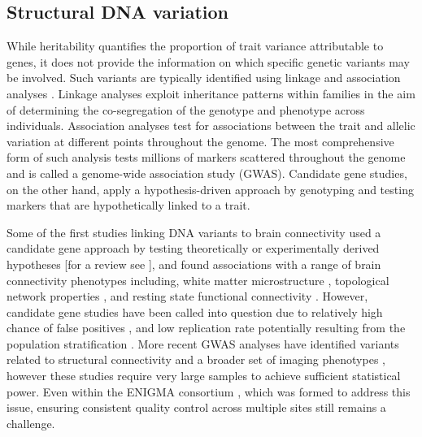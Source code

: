\subsection{Structural DNA variation}

While heritability quantifies the proportion of trait variance attributable to genes, it does not provide the information on which specific genetic variants may be involved. Such variants are typically identified using linkage and association analyses \citep{Thompson2013}. Linkage analyses exploit inheritance patterns within families in the aim of determining the co-segregation of the genotype and phenotype across individuals. Association analyses test for associations between the trait and allelic variation at different points  throughout the genome. The most comprehensive form of such analysis tests millions of markers scattered throughout the genome and is called a genome-wide association study (GWAS). Candidate gene studies, on the other hand, apply a hypothesis-driven approach by genotyping and testing markers that are hypothetically linked to a trait.

Some of the first studies linking DNA variants to brain connectivity used a candidate gene approach by testing theoretically or experimentally derived hypotheses [for a review see \citet{Thompson2013}], and found associations with a range of brain connectivity phenotypes including, white matter microstructure \citep{Braskie2012,Chiang2011,Jahanshad2012b}, topological network properties \citep{Dennis2011}, and resting state functional connectivity \citep{Filippini2009,Trachtenberg2012,Westlye2011}. However, candidate gene studies have been called into question due to relatively high chance of false positives \citep{Sullivan2007}, and low replication rate potentially resulting from the population stratification \citep{Hutchison2004}. More recent GWAS analyses have identified variants related to structural connectivity \citep{Chiang2009,Jahanshad2013,Jahanshad2012a} and a broader set of imaging phenotypes \citep{Elliott2018}, however these studies require very large samples to achieve sufficient statistical power. Even within the ENIGMA consortium \citep{Thompson2014}, which was formed to address this issue, ensuring consistent quality control across multiple sites still remains a challenge.

